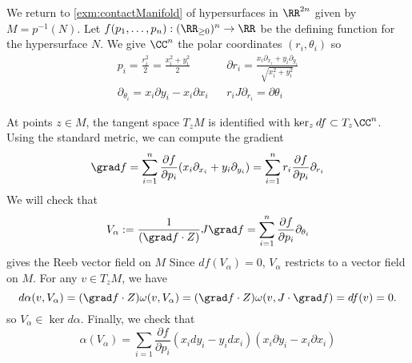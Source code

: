 

    We return to \cref{exm:contactManifold} of hypersurfaces in $\RR^{2n}$ given by $M=p^{-1}(N)$. Let $f(p_1, \ldots, p_n): (\RR_{\geq 0})^n\to \RR$ be the defining function for the hypersurface $N$. We give $\CC^n$ the polar coordinates $(r_i, \theta_i)$ so
    \begin{align*}p_i=\frac{r_i^2}{2}=\frac{x_i^2+y_i^2}{2} && \partial r_i = \frac{x_i\partial_{x_i}+ y_i \partial_{y_i}}{\sqrt{x_i^2+y_i^2}}\\
        \partial_{\theta_i}= x_i \partial y_i - x_i \partial x_i &&  r_i J \partial_{r_i} = \partial \theta_i
    \end{align*}
    
    At points $z\in M$, the tangent space $T_zM$ is identified with $\ker_z df\subset T_z\CC^n$. Using the standard metric, we can compute the gradient 
    \[\grad f =\sum_{i=1}^n \frac{\partial f}{\partial p_i} (x_i\partial_{x_i} + y_i \partial_{y_i}) = \sum_{i=1}^n r_i \frac{\partial f}{\partial p_i} \partial_{r_i}
    \]
    We will check that 
    \[V_\alpha:=  \frac{1}{(\grad f\cdot Z)} J \grad f = \sum_{i=1}^n \frac{\partial f}{\partial p_i} \partial_{\theta_i} \]
    gives the Reeb vector field on $M$
    Since $df(V_\alpha)=0$, $V_\alpha$ restricts to a vector field on $M$.
    For any $v\in T_zM$, we have 
    \[d\alpha(v, V_\alpha) = (\grad f\cdot Z) \omega(v, V_\alpha)=(\grad f\cdot Z)  \omega(v,  J\cdot \grad f)= df(v)=0.\]
    so $V_\alpha\in \ker d\alpha$. Finally, we check that 
    \[\alpha(V_\alpha)= \sum_{i=1} \frac{\partial f}{\partial p_i} (x_i dy_i - y_i dx_i)(x_i \partial y_i - x_i \partial x_i)  \]
